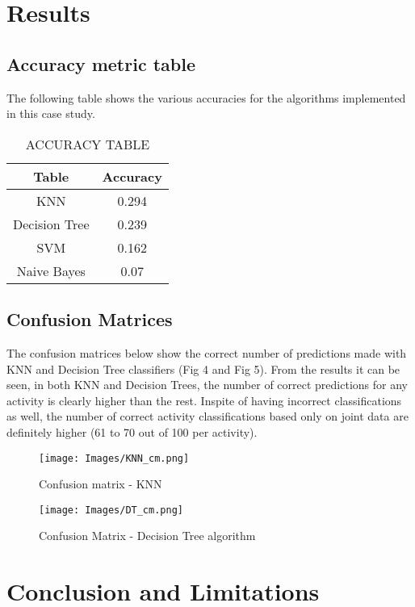 \documentclass[conference]{IEEEtran}
\begin{document}
\section{Results}
\subsection{Accuracy metric table}
The following table shows the various accuracies for the algorithms implemented in this case study. 

\begin{table}[h]
\caption{ACCURACY TABLE}
\begin{center}
\begin{tabular}{|c|c|}
\hline
\textbf{Table}&\textbf{Accuracy} \\
\hline
KNN & 0.294  \\
Decision Tree & 0.239 \\
SVM & 0.162\\
Naive Bayes & 0.07\\
\hline
\end{tabular}
\label{tab1}
\end{center}
\end{table}

\subsection{Confusion Matrices}
 The confusion matrices below show the correct number of predictions made with KNN and Decision Tree classifiers (Fig 4 and Fig 5). From the results it can be seen, in both KNN and Decision Trees, the number of correct predictions for any activity is clearly higher than the rest. Inspite of having incorrect classifications as well, the number of correct activity classifications based only on joint data are definitely higher (61 to 70 out of 100 per activity).
\begin{figure}
\centerline{\texttt{[image: Images/KNN\_cm.png]}}
\caption{Confusion matrix - KNN}
\label{fig}
\end{figure}
\begin{figure}
\centerline{\texttt{[image: Images/DT\_cm.png]}}
\caption{Confusion Matrix - Decision Tree algorithm}
\label{fig}
\end{figure}


\section{Conclusion and Limitations}
\end{document}
